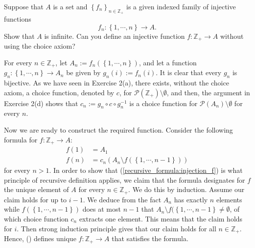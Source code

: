 \documentclass[a4paper,12pt]{article}
\begin{document}
\begin{exe}
	Suppose that \( A \) is a set and \( \left\{ f_n \right\}_{n \in \mathbb{Z}_{+}} \)
	is a given indexed family of injective functions
	\begin{equation*}
		f_n:\left\{ 1,\cdots,n \right\} \to A.
	\end{equation*}
	Show that \( A \) is infinite.
	Can you define an injective function \( f:\mathbb{Z}_{+} \to A \)
	without using the choice axiom?
\end{exe}
\begin{sol}
	For every
	\( n \in \mathbb{Z}_{+} \),
	let
	\( A_n:=f_n(\left\{ 1,\cdots,n \right\}) \),
	and let a function
	\( g_n: \left\{ 1,\cdots,n \right\} \to A_n\)
	be given by
	\( g_n(i):=f_n(i) \).
	It is clear that every
	\( g_n \)
	is bijective.
	As we have seen in Exercise 2(a),
	there exists, without the choice axiom, a choice function, denoted by \( c \), for
	\( \mathcal{P}(\mathbb{Z}_{+})\setminus \emptyset \),
	and then, the argument in Exercise 2(d) shows that 
	\( c_n:=g_n \circ c \circ g_n ^{-1} \)
	is a choice function for \( \mathcal{P}(A_n) \setminus \emptyset \)
	for every \( n \).
	
	Now we are ready to construct the required function.
	Consider the following formula for \( f:\mathbb{Z}_{+} \to A \):
	\begin{equation}\label{recursive_formula:injection_f}
		\begin{split}
			f(1)&=A_1\\
			f(n)&=c_n \left( A_n \setminus f(\left\{ 1,\cdots,n-1 \right\}) \right)
		\end{split}
	\end{equation}
	for every \( n >1 \).
	In order to show that (\ref{recursive_formula:injection_f}) is what
	principle of recursive definition applies,
	we claim that the formula designates for \( f \) the unique element of \( A \) for every \( n\in \mathbb{Z}_{+} \).
	We do this by induction.
	Assume our claim holds for up to \( i-1 \).
	We deduce from the fact
	\( A_n \) has exactly \( n \) elements
	while
	\( f(\left\{ 1,\cdots,n-1 \right\}) \) does at most \( n-1 \)
	that 
	\( A_n \setminus f(\left\{ 1,\cdots,n-1 \right\} \neq \emptyset \),
	of which choice function \( c_n \) extracts one element.
	This means that the claim holds for \( i \).
	Then strong induction principle gives that
	our claim holds for all \( n \in \mathbb{Z}_{+} \).
	Hence, () defines unique
	\( f:\mathbb{Z}_{+} \to A \)
	that satisfies the formula.
	

\end{sol}
\end{document}

